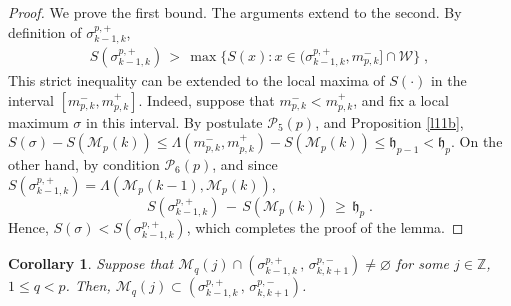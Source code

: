 \documentclass[reqno]{amsart}
\theoremstyle{plain}
\newtheorem{corollary}[theorem]{Corollary}
\theoremstyle{definition}
\newcommand{\mc}[1]{{\mathcal #1}}
\newcommand{\mf}[1]{{\mathfrak #1}}
\newcommand{\bb}[1]{{\mathbb #1}}
\newcommand{\ms}[1]{{\mathscr #1}}
\newcommand{\<}{\langle}
\renewcommand{\>}{\rangle}
\begin{document}
\begin{proof}
We prove the first bound. The arguments extend to the second.
By definition of $\sigma^{p,+}_{k-1,k}$,
\begin{gather*}
S(\sigma^{p,+}_{k-1,k}) \,>\, \max \{ S(x) : x\in (\sigma^{p,+}_{k-1,k}
,m^-_{p,k} ]\cap \mc W\}\;,
\end{gather*}
This strict inequality can be extended to the local maxima of
$S(\cdot)$ in the interval $[m^-_{p,k}, m^+_{p,k} ]$. Indeed, suppose
that $m^-_{p,k}< m^+_{p,k}$, and fix a local maximum $\sigma$ in this
interval. By postulate $\mc P_5(p)$, and Proposition \ref{l11b},
$S(\sigma) - S(\ms M_p(k))\le \Lambda(m^-_{p,k}, m^+_{p,k}) - S(\ms
M_p(k)) \le \mf h_{p-1} < \mf h_p$. On the other hand, by condition
$\mc P_6(p)$, and since
$S(\sigma^{p,+}_{k-1,k}) = \Lambda(\ms M_p(k-1), \ms M_p(k))$,
\begin{equation}
\label{27}
S(\sigma^{p,+}_{k-1,k}) \,-\,  S(\ms M_p(k))  \,\ge\, \mf h_p  \;.
\end{equation}
Hence, $S(\sigma) < S(\sigma^{p,+}_{k-1,k})$, which completes the
proof of the lemma.
\end{proof}

\begin{corollary}
\label{l21}
Suppose that
$\ms M_{q}(j) \cap (\sigma^{p,+}_{k-1,k} \,,\,
\sigma^{p,-}_{k,k+1}) \neq \varnothing$ for some $j\in \bb Z$, $1\le
q<p$. Then,
$\ms M_{q}(j) \subset (\sigma^{p,+}_{k-1,k} \,,\,
\sigma^{p,-}_{k,k+1})$.
\end{corollary}
\end{document}
